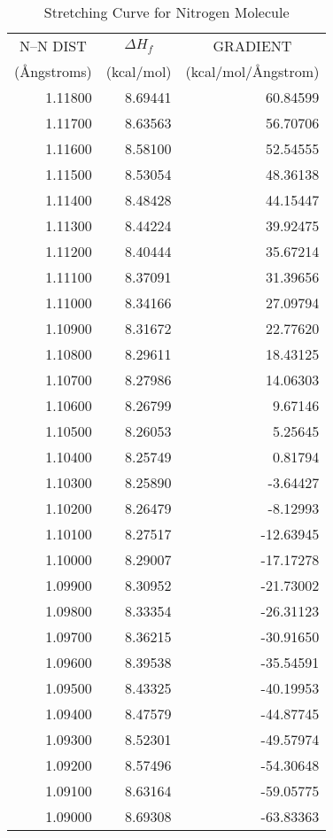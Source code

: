 \begin{table}
\caption{\label{n2}Stretching Curve for Nitrogen Molecule}
\begin{center}
\begin{tabular}{rrr}
\multicolumn{1}{c}{N--N DIST} & \multicolumn{1}{c}{$\Delta H_f$}  & \multicolumn{1}{c}{GRADIENT}\\
\multicolumn{1}{c}{(\AA ngstroms)} &\multicolumn{1}{c}{(kcal/mol)} & \multicolumn{1}{c}{(kcal/mol/\AA ngstrom)}\\
\hline
1.11800   &  8.69441  &   60.84599 \\
1.11700   &  8.63563  &   56.70706 \\
1.11600   &  8.58100  &   52.54555 \\
1.11500   &  8.53054  &   48.36138 \\
1.11400   &  8.48428  &   44.15447 \\
1.11300   &  8.44224  &   39.92475 \\
1.11200   &  8.40444  &   35.67214 \\
1.11100   &  8.37091  &   31.39656 \\
1.11000   &  8.34166  &   27.09794 \\
1.10900   &  8.31672  &   22.77620 \\
1.10800   &  8.29611  &   18.43125 \\
1.10700   &  8.27986  &   14.06303 \\
1.10600   &  8.26799  &    9.67146 \\
1.10500   &  8.26053  &    5.25645 \\
1.10400   &  8.25749  &    0.81794 \\
1.10300   &  8.25890  &   -3.64427 \\
1.10200   &  8.26479  &   -8.12993 \\
1.10100   &  8.27517  &  -12.63945 \\
1.10000   &  8.29007  &  -17.17278 \\
1.09900   &  8.30952  &  -21.73002 \\
1.09800   &  8.33354  &  -26.31123 \\
1.09700   &  8.36215  &  -30.91650 \\
1.09600   &  8.39538  &  -35.54591 \\
1.09500   &  8.43325  &  -40.19953 \\
1.09400   &  8.47579  &  -44.87745 \\
1.09300   &  8.52301  &  -49.57974 \\
1.09200   &  8.57496  &  -54.30648 \\
1.09100   &  8.63164  &  -59.05775 \\
1.09000   &  8.69308  &  -63.83363 \\
\end{tabular}
\end{center}
\end{table}

